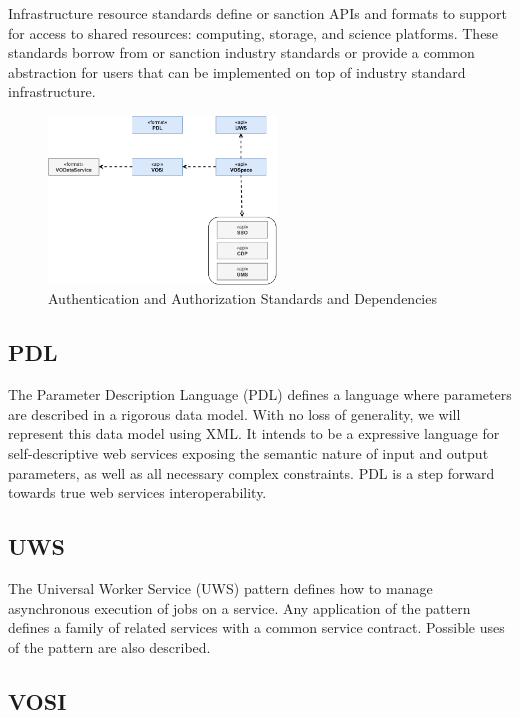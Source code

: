 \documentclass[11pt,a4paper]{ivoa}
\begin{document}
Infrastructure resource standards define or sanction APIs and formats to support for access 
to shared resources: computing, storage, and science platforms. These standards borrow from
or sanction industry standards or provide a common abstraction for users that can be implemented 
on top of industry standard infrastructure.

\begin{figure}[h]
\centering
\includegraphics[width=0.54\textwidth]{ivoa-arch-gws.pdf}
\caption{Authentication and Authorization Standards and Dependencies}
\label{fig:gwsdeps}
\end{figure}

\subsection{PDL}

The Parameter Description Language (PDL) \citep{2014ivoa.spec.0523Z} defines a language where parameters are described in a 
rigorous data model. With no loss of generality, we will represent this data model using 
XML. It intends to be a expressive language for self-descriptive web services exposing 
the semantic nature of input and output parameters, as well as all necessary complex 
constraints. PDL is a step forward towards true web services interoperability. 
 
\subsection{UWS} 

The Universal Worker Service (UWS) \citep{2016ivoa.spec.1024H} pattern defines how to manage asynchronous execution 
of jobs on a service. Any application of the pattern defines a family of related services 
with a common service contract. Possible uses of the pattern are also described. 

\subsection{VOSI} 
\end{document}

